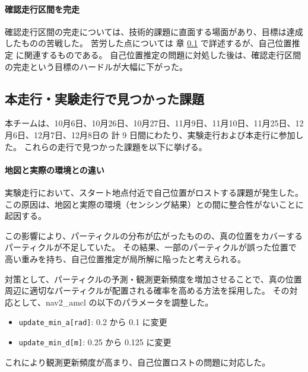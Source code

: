 \documentclass[twocolumn,9pt]{jsproceedings}
\begin{document}
\paragraph{確認走行区間を完走}
確認走行区間の完走については、技術的課題に直面する場面があり、目標は達成したものの苦戦した。
苦労した点については 章 \ref{sec:4} で詳述するが、自己位置推定 に関連するものである。
自己位置推定の問題に対処した後は、確認走行区間の完走という目標のハードルが大幅に下がった。


\subsection{本走行・実験走行で見つかった課題}\label{sec:4}

本チームは、10月6日、10月26日、10月27日、11月9日、11月10日、11月25日、12月6日、12月7日、12月8日の
計 9 日間にわたり、実験走行および本走行に参加した。
これらの走行で見つかった課題を以下に挙げる。

\paragraph{地図と実際の環境との違い}
実験走行において、スタート地点付近で自己位置がロストする課題が発生した。
この原因は、地図と実際の環境（センシング結果）との間に整合性がないことに起因する。

この影響により、パーティクルの分布が広がったものの、真の位置をカバーするパーティクルが不足していた。
その結果、一部のパーティクルが誤った位置で高い重みを持ち、自己位置推定が局所解に陥ったと考えられる。

対策として、パーティクルの予測・観測更新頻度を増加させることで、真の位置周辺に適切なパーティクルが配置される確率を高める方法を採用した。
その対応として、nav2\_amcl の以下のパラメータを調整した。

\begin{itemize}
  \item \texttt{update\_min\_a[rad]}: 0.2 から 0.1 に変更  
  \item \texttt{update\_min\_d[m]}: 0.25 から 0.125 に変更  
\end{itemize}
これにより観測更新頻度が高まり、自己位置ロストの問題に対応した。

\end{document}

